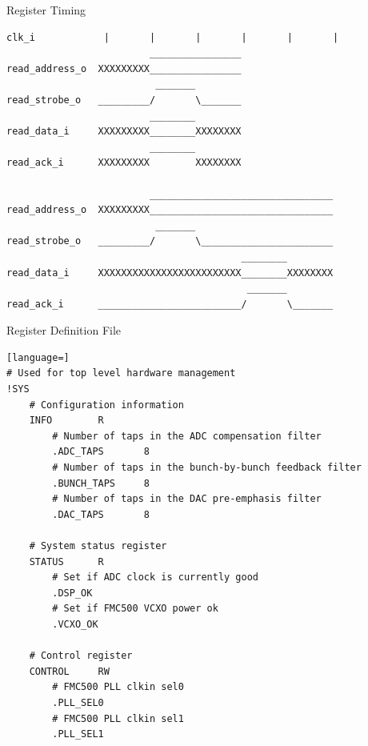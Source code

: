 \documentclass[xcolor=table]{beamer}
\begin{document}
%
\begin{frame}[fragile]{Register Timing}

\begin{lstlisting}
clk_i            |       |       |       |       |       |
                         ________________
read_address_o  XXXXXXXXX________________
                          _______
read_strobe_o   _________/       \_______
                         ________
read_data_i     XXXXXXXXX________XXXXXXXX
                         ________
read_ack_i      XXXXXXXXX        XXXXXXXX

                         ________________________________
read_address_o  XXXXXXXXX________________________________
                          _______
read_strobe_o   _________/       \_______________________
                                         ________
read_data_i     XXXXXXXXXXXXXXXXXXXXXXXXX________XXXXXXXX
                                          _______
read_ack_i      _________________________/       \_______
\end{lstlisting}

\end{frame}


%
\begin{frame}[fragile]{Register Definition File}

\begin{lstlisting}[language=]
# Used for top level hardware management
!SYS
    # Configuration information
    INFO        R
        # Number of taps in the ADC compensation filter
        .ADC_TAPS       8
        # Number of taps in the bunch-by-bunch feedback filter
        .BUNCH_TAPS     8
        # Number of taps in the DAC pre-emphasis filter
        .DAC_TAPS       8

    # System status register
    STATUS      R
        # Set if ADC clock is currently good
        .DSP_OK
        # Set if FMC500 VCXO power ok
        .VCXO_OK

    # Control register
    CONTROL     RW
        # FMC500 PLL clkin sel0
        .PLL_SEL0
        # FMC500 PLL clkin sel1
        .PLL_SEL1
\end{lstlisting}

\end{frame}
\end{document}
